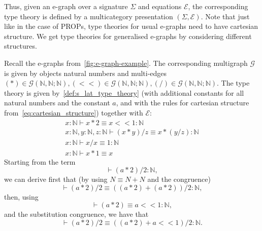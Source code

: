 Thus, given an e-graph over a signature $\Sigma$ and equations $\mathcal{E}$, the corresponding type theory is defined by a multicategory presentation $(\Sigma, \mathcal{E})$.
Note that just like in the case of PROPs, type theories for usual e-graphs need to have cartesian structure. 
We get type theories for generalised e-graphs by considering different structures.

\begin{example}
  Recall the e-graphs from~\autoref{fig:e-graph-example}.
  The corresponding multigraph $\mathcal{G}$ is given by objects natural numbers and multi-edges $(*) \in \mathcal{G}(\mathbb{N}, \mathbb{N}; \mathbb{N}), (<\!\!<) \in \mathcal{G}(\mathbb{N}, \mathbb{N}; \mathbb{N}), (/) \in \mathcal{G}(\mathbb{N}, \mathbb{N}; \mathbb{N})$.
  The type theory is given by~\autoref{def:s_lat_type_theory} (with additional constants for all natural numbers and the constant $a$, and with the rules for cartesian structure from~\autoref{eq:cartesian_structure}) together with $\mathcal{E}$:
  \begin{gather*}
    x : \mathbb{N} \vdash x * 2 \equiv x <\!\!< 1 : \mathbb{N}\\
    x : \mathbb{N}, y : \mathbb{N}, z : \mathbb{N} \vdash (x * y) / z \equiv x * (y / z) : \mathbb{N}\\
    x : \mathbb{N} \vdash x / x \equiv 1 : \mathbb{N}\\
    x : \mathbb{N} \vdash x * 1 \equiv x
  \end{gather*}
  Starting from the term 
  \[
  \vdash (a * 2) / 2 : \mathbb{N},
  \] 
  we can derive first that (by using $N \equiv N + N$ and the congruence)
  \[
  \vdash (a * 2) / 2 \equiv ((a * 2) + (a * 2)) / 2 : \mathbb{N},
  \]
  then, using
  \[
  \vdash (a * 2) \equiv a <\!\!< 1 : \mathbb{N},
  \]
  and the substitution congruence, we have that
  \[
  \vdash (a * 2) / 2 \equiv ((a * 2) + a <\!\!< 1) / 2 : \mathbb{N}.
  \]
\end{example}

